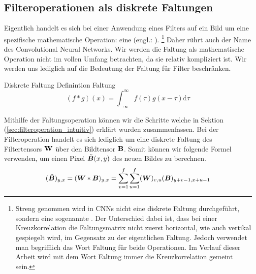 \subsection{Filteroperationen als diskrete Faltungen}
Eigentlich handelt es sich bei einer Anwendung eines Filters auf ein Bild um
eine spezifische mathematische Operation: eine  (engl.:
).
\footnote{
  Streng genommen wird in CNNs nicht eine diskrete Faltung durchgeführt, sondern
  eine sogenannte . Der Unterschied dabei ist, dass bei einer
  Kreuzkorrelation die Faltungsmatrix nicht zuerst horizontal, wie auch vertikal
  gespiegelt wird, im Gegensatz zu der eigentlichen Faltung. Jedoch verwendet man
  begrifflich das Wort Faltung für beide Operationen. Im Verlauf dieser Arbeit
  wird mit dem Wort Faltung immer die Kreuzkorrelation gemeint sein.
}
Daher rührt auch der Name des Convolutional Neural Networks.
Wir werden die Faltung als mathematische Operation nicht im vollen Umfang
betrachten, da sie relativ kompliziert ist. Wir werden uns lediglich auf die
Bedeutung der Faltung für Filter beschränken.
\para{}
\begin{defbox}{Diskrete Faltung}
  Definintion Faltung
  \begin{equation}
    (f * g)(x) = \int_{-\infty}^{\infty} f(\tau) g(x-\tau) \text{d}\tau
  \end{equation}
\end{defbox}
\para{}
Mithilfe der Faltungsoperation können wir die Schritte welche in Sektion
(\ref{sec:filteroperation_intuitiv}) erklärt wurden zusammenfassen.
Bei der Filteroperation handelt es sich lediglich um eine diskrete Faltung des
Filtertensors $\mathbf{W}$ über den Bildtensor $\mathbf{B}$. Somit können wir
folgende Formel verwenden, um einen Pixel $\tilde{\bm{B}}(x,y)$ des neuen Bildes zu berechnen.
\\
\begin{equation}
  (\tilde{\bm{B}})_{y,x} = (\bm{W} * \bm{B})_{y,x} = \sum_{v=1}^{f} \sum_{u=1}^{f} (\bm{W})_{v,u}(\bm{B})_{y+v-1,x+u-1}
\end{equation}
\para{}
